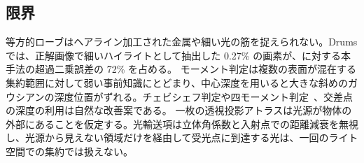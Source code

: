 \subsection{限界}
\label{sec:limitations}
等方的ローブはヘアライン加工された金属や細い光の筋を捉えられない。Drums では、正解画像で細いハイライトとして抽出した 0.27\% の画素が、\gsthree に対する本手法の超過二乗誤差の 72\% を占める。
モーメント判定は複数の表面が混在する集約範囲に対して弱い事前知識にとどまり、中心深度を用いると大きな斜めのガウシアンの深度位置がずれる。チェビシェフ判定や四モーメント判定~\cite{donnelly2006variance,peters2015moment}、交差点の深度の利用は自然な改善案である。
一枚の透視投影アトラスは光源が物体の外部にあることを仮定する。光輸送項は立体角係数と入射点での距離減衰を無視し、光源から見えない領域だけを経由して受光点に到達する光は、一回のライト空間での集約では扱えない。
